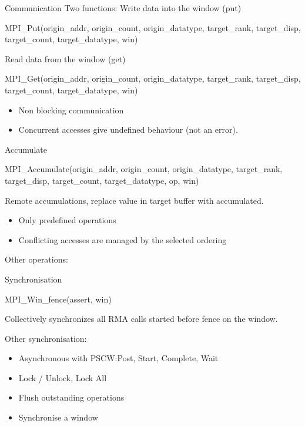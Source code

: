 \documentclass[aspectratio=43]{beamer}
\begin{document}
\begin{frame}[fragile]{Communication}
Two functions:
Write data into the window (put)
\begin{Pseudolisting}[]{}
MPI_Put(origin_addr, origin_count, origin_datatype, 
        target_rank, target_disp, target_count, target_datatype, win)
\end{Pseudolisting}

Read data from the window (get)
\begin{Pseudolisting}[]{}
MPI_Get(origin_addr, origin_count, origin_datatype, 
        target_rank, target_disp, target_count, 
        target_datatype, win)
\end{Pseudolisting}

\begin{itemize}
\item Non blocking communication
\item Concurrent accesses give undefined behaviour (not an error).
\end{itemize}

\end{frame}


\begin{frame}[fragile]{Accumulate}
\begin{Pseudolisting}[]{}
MPI_Accumulate(origin_addr, origin_count, origin_datatype,
               target_rank, target_disp, target_count, 
               target_datatype, op, win)
\end{Pseudolisting}

Remote accumulations, replace value in target buffer with accumulated.

\begin{itemize}
\item Only predefined operations
\item Conflicting accesses are managed by the selected ordering
\end{itemize}

Other operations: 
\end{frame}

\begin{frame}[fragile]{Synchronisation}
\begin{Pseudolisting}[]{}
MPI_Win_fence(assert, win)
\end{Pseudolisting}
Collectively synchronizes all RMA calls started before fence on the window.

Other synchronisation:
\begin{itemize}
\item Asynchronous with PSCW:\@ Post, Start, Complete, Wait
\item Lock / Unlock, Lock All
\item Flush outstanding operations
\item Synchronise a window
\end{itemize}
\end{frame}

\end{document}
